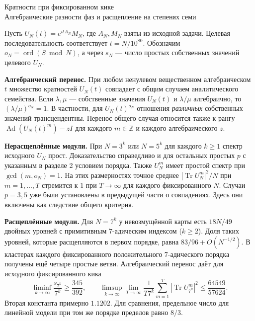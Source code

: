 \documentclass[11pt,a4paper]{article}
\newcommand{\Tr}{\operatorname{Tr}}
\newcommand{\Z}{\mathbb Z}
\newcommand{\Ad}{\operatorname{Ad}}
\newcommand{\ord}{\operatorname{ord}}
\begin{document}
\begin{center}{\LARGE\sffamily Кратности при фиксированном кике}\\[4pt]
{\large Алгебраические разности фаз и расщепление на степенях семи}
\end{center}
Пусть \(U_N(t)=e^{itA_N}M_N\), где \(A_N,M_N\) взяты из исходной задачи. Целевая последовательность соответствует \(t=N/10^{80}\). Обозначим \(o_N=\ord(S\bmod N)\), а через \(s_N\) --- число простых собственных значений целевого \(U_N\).

\textbf{Алгебраический перенос.} При любом ненулевом вещественном алгебраическом \(t\) множество кратностей \(U_N(t)\) совпадает с общим случаем аналитического семейства. Если \(\lambda,\mu\) --- собственные значения \(U_N(t)\) и \(\lambda/\mu\) алгебраично, то \((\lambda/\mu)^{o_N}=1\). В частности, для \(U_N(t)^{o_N}\) отношения \emph{различных} собственных значений трансцендентны. Перенос общего случая относится также к рангу \(\Ad(U_N(t)^m)-zI\) для каждого \(m\in\Z\) и каждого алгебраического \(z\).

\textbf{Нерасщеплённые модули.} При \(N=3^k\) или \(N=5^k\) для каждого \(k\ge1\) спектр исходного \(U_N\) прост. Доказательство справедливо и для остальных простых \(p\) с указанным в разделе 2 условием порядка. Также \(U_N^m\) имеет простой спектр при \(\gcd(m,o_N)=1\). На этих размерностях точное среднее \(|\Tr U_N^m|^2/N\) при \(m=1,\ldots,T\) стремится к \(1\) при \(T\to\infty\) для каждого фиксированного \(N\). Случаи \(p=3,5\) уже были установлены в предыдущей части о совпадениях. Здесь они включены как следствие общего критерия.

\textbf{Расщеплённые модули.} Для \(N=7^k\) у невозмущённой карты есть \(18N/49\) двойных уровней с примитивным \(7\)-адическим индексом (\(k\ge2\)). Доля таких уровней, которые расщепляются в первом порядке, равна \(83/96+O(N^{-1/2})\). В кластерах каждого фиксированного положительного \(7\)-адического порядка получены ещё четыре простые ветви. Алгебраический перенос даёт для исходного фиксированного кика
\[
 \liminf_{k\to\infty}\frac{s_{7^k}}{7^k}\ge\frac{345}{392},\qquad
 \limsup_{k\to\infty}\lim_{T\to\infty}\frac1{T7^k}
              \sum_{m=1}^T|\Tr U_{7^k}^m|^2\le\frac{64549}{57624}.
\]
Вторая константа примерно \(1.1202\). Для сравнения, предельное число для линейной модели при том же порядке пределов равно \(8/3\).
\end{document}
